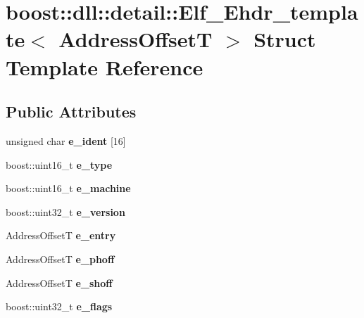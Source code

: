 \hypertarget{a00085}{}\section{boost\+:\+:dll\+:\+:detail\+:\+:Elf\+\_\+\+Ehdr\+\_\+template$<$ Address\+OffsetT $>$ Struct Template Reference}
\label{a00085}
\subsection*{Public Attributes}
\begin{DoxyCompactItemize}
\item 
unsigned char {\bfseries e\+\_\+ident} \mbox{[}16\mbox{]}\hypertarget{a00085_abd8c4939b91291c458036b4807e42f44}{}\label{a00085_abd8c4939b91291c458036b4807e42f44}

\item 
boost\+::uint16\+\_\+t {\bfseries e\+\_\+type}\hypertarget{a00085_ad761c6ff499b8981693c43d55878e9a1}{}\label{a00085_ad761c6ff499b8981693c43d55878e9a1}

\item 
boost\+::uint16\+\_\+t {\bfseries e\+\_\+machine}\hypertarget{a00085_aae3b4d52bdf89e04371782ba642ce281}{}\label{a00085_aae3b4d52bdf89e04371782ba642ce281}

\item 
boost\+::uint32\+\_\+t {\bfseries e\+\_\+version}\hypertarget{a00085_a96cddf93afbcbbc9830713f26ce02b5a}{}\label{a00085_a96cddf93afbcbbc9830713f26ce02b5a}

\item 
Address\+OffsetT {\bfseries e\+\_\+entry}\hypertarget{a00085_a332c4575e5f2e605dc877175929aba24}{}\label{a00085_a332c4575e5f2e605dc877175929aba24}

\item 
Address\+OffsetT {\bfseries e\+\_\+phoff}\hypertarget{a00085_aa3b51c343127152028891c427f36c96c}{}\label{a00085_aa3b51c343127152028891c427f36c96c}

\item 
Address\+OffsetT {\bfseries e\+\_\+shoff}\hypertarget{a00085_a8a02464e0684454b89bc0124a87fee6f}{}\label{a00085_a8a02464e0684454b89bc0124a87fee6f}

\item 
boost\+::uint32\+\_\+t {\bfseries e\+\_\+flags}\hypertarget{a00085_a371d9ac16582e3c32defb575809892f6}{}\label{a00085_a371d9ac16582e3c32defb575809892f6}


\end{DoxyCompactItemize}
